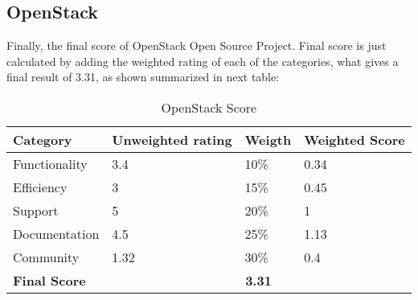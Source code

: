 \documentclass[11pt]{article}
\begin{document}
\subsection{OpenStack}
Finally, the final score of OpenStack Open Source Project. Final score is just calculated by adding the weighted rating of each of the categories, what gives a final result of 3.31, as shown summarized in next table:
\begin{table}[H]
  \begin{center}
    \begin{tabular}{ | p{3cm} | p{2.5cm} | p{1.5cm} | p{2cm} | }
    \toprule
    \textbf{Category} & \textbf{Unweighted rating} & \textbf{Weigth} & \textbf{Weighted Score}\\
    \hline
    Functionality & 3.4 & 10\% & 0.34\\
    \hline
    Efficiency & 3 & 15\% & 0.45\\
    \hline
    Support & 5 & 20\% & 1\\
    \hline
    Documentation & 4.5 & 25\% & 1.13\\
    \hline
    Community & 1.32 & 30\% & 0.4\\
    \midrule
    \textbf{Final Score} & \multicolumn {3}{c|}{\textbf{3.31}}\\
    \bottomrule
    \end{tabular}
    \caption{OpenStack Score}
    \label{tab:openstack_score}
  \end{center}
\end{table}
\end{document}
